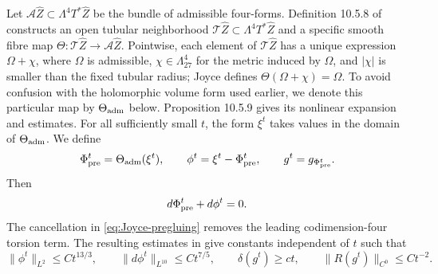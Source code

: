 \documentclass[11pt]{article}
\theoremstyle{remark}\newtheorem{remark}[theorem]{Remark}
\begin{document}
Let $\mathcal A\widehat Z\subset\Lambda^4T^*\widehat Z$ be the bundle of
admissible four-forms.  Definition 10.5.8 of \cite{JoyceBook} constructs
an open tubular neighborhood
$\mathcal T\widehat Z\subset\Lambda^4T^*\widehat Z$ and a specific smooth
fibre map $\Theta:\mathcal T\widehat Z\to\mathcal A\widehat Z$.  Pointwise,
each element of $\mathcal T\widehat Z$ has a unique expression
$\Omega+\chi$, where $\Omega$ is admissible,
$\chi\in\Lambda^4_{27}$ for the metric induced by $\Omega$, and $|\chi|$
is smaller than the fixed tubular radius; Joyce defines
$\Theta(\Omega+\chi)=\Omega$.  To avoid confusion with the holomorphic
volume form used earlier, we denote this particular map by
$\Theta_{\rm adm}$ below.  Proposition 10.5.9 gives its nonlinear
expansion and estimates.
For all sufficiently small $t$, the form $\xi^t$ takes values in the
domain of $\Theta_{\rm adm}$.  We define
\begin{equation}\label{eq:pre-torsion}
 \Phi_{\rm pre}^t=\Theta_{\rm adm}(\xi^t),\qquad
 \phi^t=\xi^t-\Phi_{\rm pre}^t,\qquad
 g^t=g_{\Phi_{\rm pre}^t}.
\end{equation}
Then
\begin{equation}\label{eq:torsion-primitive}
 d\Phi_{\rm pre}^t+d\phi^t=0.
\end{equation}
The cancellation in \eqref{eq:Joyce-pregluing} removes the leading
codimension-four torsion term.  The resulting estimates in
\cite[Theorem 13.5.8]{JoyceBook} give constants independent of $t$ such
that
\begin{equation}\label{eq:Joyce-estimates}
 \|\phi^t\|_{L^2}\le Ct^{13/3},\qquad
 \|d\phi^t\|_{L^{10}}\le Ct^{7/5},\qquad
 \delta(g^t)\ge ct,\qquad
 \|R(g^t)\|_{C^0}\le Ct^{-2}.
\end{equation}
\end{document}
